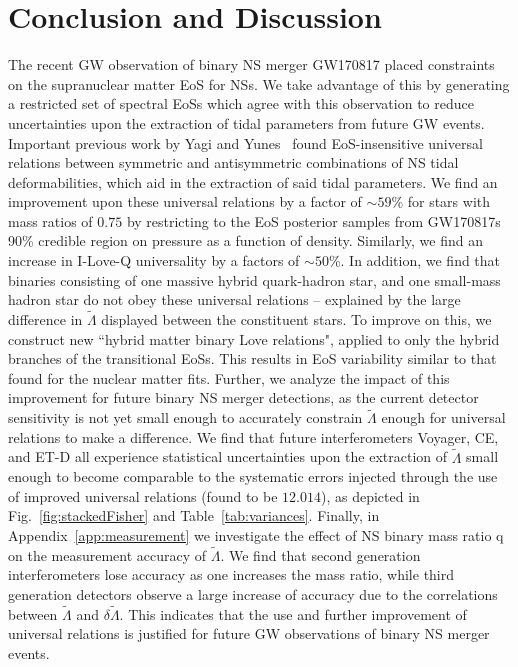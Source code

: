 \documentclass[prd,twocolumn,nofootinbib,superscriptaddress,amsmath,amssymb]{revtex4-1}
\begin{document}
\section{Conclusion and Discussion}\label{sec:conclusion}
The recent GW observation of binary NS merger GW170817 placed constraints on the supranuclear matter EoS for NSs.
We take advantage of this by generating a restricted set of spectral EoSs which agree with this observation to reduce uncertainties upon the extraction of tidal parameters from future GW events.
Important previous work by Yagi and Yunes~\cite{Yagi:ILQ,Yagi:binLove} found EoS-insensitive universal relations between symmetric and antisymmetric combinations of NS tidal deformabilities, which aid in the extraction of said tidal parameters.
We find an improvement upon these universal relations by a factor of $\sim 59$\% for stars with mass ratios of $0.75$ by restricting to the EoS posterior samples from GW170817s 90\% credible region on pressure as a function of density.
Similarly, we find an increase in I-Love-Q universality by a factors of $\sim 50$\%.
In addition, we find that binaries consisting of one massive hybrid quark-hadron star, and one small-mass hadron star do not obey these universal relations -- explained by the large difference in $\tilde{\Lambda}$ displayed between the constituent stars.
To improve on this, we construct new ``hybrid matter binary Love relations", applied to only the hybrid branches of the transitional EoSs.
This results in EoS variability similar to that found for the nuclear matter fits.
Further, we analyze the impact of this improvement for future binary NS merger detections, as the current detector sensitivity is not yet small enough to accurately constrain $\tilde{\Lambda}$ enough for universal relations to make a difference.
We find that future interferometers Voyager, CE, and ET-D all experience statistical uncertainties upon the extraction of $\tilde{\Lambda}$ small enough to become comparable to the systematic errors injected through the use of improved universal relations (found to be $12.014$), as depicted in Fig.~\ref{fig:stackedFisher} and Table~\ref{tab:variances}.
Finally, in Appendix~\ref{app:measurement} we investigate the effect of NS binary mass ratio q on the measurement accuracy of $\tilde\Lambda$.
We find that second generation interferometers lose accuracy as one increases the mass ratio, while third generation detectors observe a large increase of accuracy due to the correlations between $\tilde\Lambda$ and $\delta\tilde\Lambda$.
This indicates that the use and further improvement of universal relations is justified for future GW observations of binary NS merger events.
\end{document}

